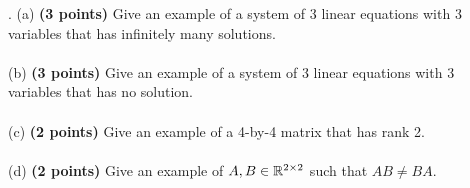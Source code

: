 \documentclass[12pt,a4paper]{article}
\newcommand{\gray}[1]{\textcolor{gray}{}}
\renewcommand{\l}{\left}
\renewcommand{\r}{\right}
\newcommand{\x}{\times}
\def\R{\ifmmode\mathbb R\fi}
\begin{document}
\newpage
{}. (a) \textbf{(3 points)} Give an example of a system of 3 linear equations with 3 variables that has infinitely many solutions. \\
\\
(b) \textbf{(3 points)} Give an example of a system of 3 linear equations with 3 variables that has no solution. \\
\\
(c) \textbf{(2 points)} Give an example of a 4-by-4 matrix that has rank 2. \\
\\
(d) \textbf{(2 points)} Give an example of $A, B \in \R^{2\x 2}$ such that $AB \neq BA$. \\
\\
\gray{
    (a)
\begin{equation*}
	\l\{
	\begin{array}{l}
	    x+y+z = 1\\
	    2x+2y+2z = 2\\
	    z=1
	\end{array}
	\r.
\end{equation*}
(b)
\begin{equation*}
	\l\{
	\begin{array}{l}
	    x+y+z = 1\\
	    2x+2y+2z = 3\\
	    z=1
	\end{array}
	\r.
\end{equation*}
(c) 
	\begin{equation*}
	A = \l[
	\begin{array}{cccc}
	    1 & 0 & 0 & 0 \\
	    0 & 1 & 0 & 0 \\
	    0 & 0 & 0 & 0\\
	    0 & 0 & 0 & 0
	\end{array}
	\r]
	\end{equation*}
(d)
	\begin{equation*}
	A = \l[
	\begin{array}{cc}
	    0 & 0 \\
	    1 & 0
	\end{array}
	\r], 
	B = \l[
	\begin{array}{cc}
	    1 & 0 \\
	    1 & 0
	\end{array}
	\r],
	AB = \l[
	\begin{array}{cc}
	    0 & 0 \\
	    1 & 0
	\end{array}
	\r],
	BA = \l[
	\begin{array}{cc}
	    0 & 0 \\
	    0 & 0
	\end{array}
	\r]
	\end{equation*}
}
\end{document}

